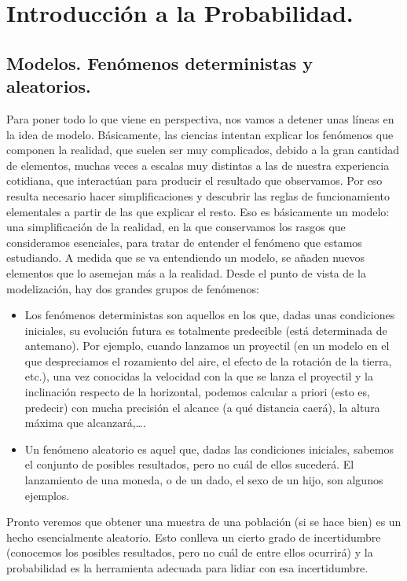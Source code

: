 
\section*{Introducción a la Probabilidad.}
\label{part02:intro}

\subsection*{Modelos. Fenómenos deterministas y aleatorios.}

Para poner todo lo que viene en perspectiva, nos vamos a detener unas líneas en la idea de {\sf
modelo}. Básicamente, las ciencias intentan explicar los fen\'omenos que componen la
realidad, que suelen ser muy complicados, debido a la gran cantidad de elementos, muchas veces a
escalas muy distintas a las de nuestra experiencia cotidiana, que interactúan para producir el
resultado que observamos. Por eso resulta necesario hacer simplificaciones y descubrir las reglas
de funcionamiento elementales a partir de las que explicar el resto. Eso es básicamente un modelo:
una simplificación de la realidad, en la que conservamos los rasgos que consideramos esenciales,
para tratar de entender el fenómeno que estamos estudiando. A medida que se va entendiendo un
modelo, se añaden nuevos elementos que lo asemejan m\'as a la realidad. Desde el punto de vista de
la modelizaci\'on, hay dos grandes grupos de fen\'omenos:
\begin{itemize}
    \item Los {\sf fenómenos deterministas}  son aquellos en los
        que, dadas unas condiciones iniciales, su evoluci\'on futura es totalmente predecible
        (est\'a determinada de antemano). Por ejemplo, cuando lanzamos un proyectil (en un modelo
        en el que despreciamos el rozamiento del aire, el efecto de la rotaci\'on de la 			
        tierra, etc.), una vez conocidas la velocidad con la que se lanza el proyectil y la
        inclinaci\'on respecto de la horizontal, podemos calcular a priori (esto es, predecir)
        con mucha precisión el alcance (a qu\'e distancia caer\'a), la altura m\'axima que
        alcanzar\'a,\dots.
    \item Un {\sf fen\'omeno aleatorio}  	es aquel que, dadas las
        condiciones iniciales, sabemos el conjunto de posibles resultados, pero no cu\'al de
        ellos suceder\'a. El lanzamiento de una moneda, o de un dado, el sexo de un hijo, son
        algunos ejemplos.
\end{itemize}
Pronto veremos que obtener una muestra de una poblaci\'on (si se hace bien) es un hecho
esencialmente aleatorio. Esto conlleva un cierto grado de incertidumbre (conocemos los posibles
resultados, pero no cu\'al de entre ellos ocurrirá) y la probabilidad es la herramienta adecuada
para lidiar con esa incertidumbre.

